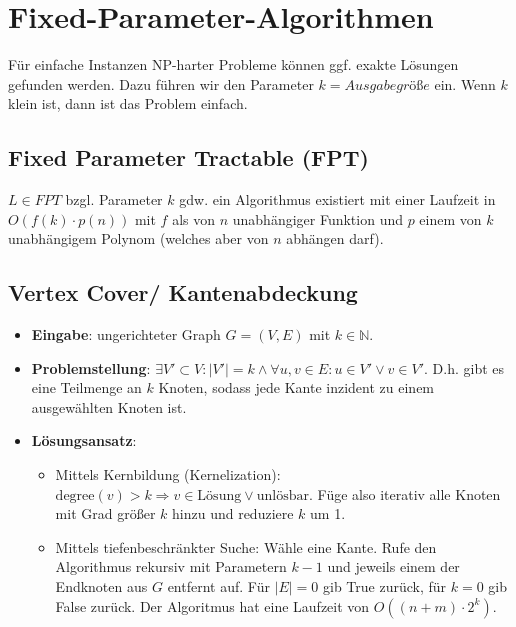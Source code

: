 \chapter{Fixed-Parameter-Algorithmen}

Für einfache Instanzen NP-harter Probleme können ggf. exakte Lösungen gefunden werden. 
Dazu führen wir den Parameter $k = Ausgabegröße$ ein. Wenn $k$ klein ist, dann ist das Problem einfach.


\section{Fixed Parameter Tractable (FPT)}
$L\in FPT$ bzgl. Parameter $k$ gdw. ein Algorithmus existiert mit einer Laufzeit in $O(f(k)\cdot p(n))$ mit $f$ als von $n$ unabhängiger Funktion und $p$ einem von $k$ unabhängigem Polynom (welches aber von $n$ abhängen darf).

\section{Vertex Cover/ Kantenabdeckung}

\begin{itemize}
  \item \textbf{Eingabe}: ungerichteter Graph $G=(V,E)$ mit $k\in \mathbb{N}$.
  \item \textbf{Problemstellung}: $\exists V' \subset V: |V'| = k \land \forall {u,v} \in E: u\in V' \lor v \in V'$. D.h. gibt es eine Teilmenge an $k$ Knoten, sodass jede Kante inzident zu einem ausgewählten Knoten ist.
  \item \textbf{Lösungsansatz}: 
  \begin{itemize}
  	\item Mittels Kernbildung (Kernelization): $\text{degree}(v)>k \Rightarrow v \in \text{Lösung} \lor \text{unlösbar}$. Füge also iterativ alle Knoten mit Grad größer $k$ hinzu und reduziere $k$ um 1.
  	\item Mittels tiefenbeschränkter Suche: Wähle eine Kante. Rufe den Algorithmus rekursiv mit Parametern $k-1$ und jeweils einem der Endknoten aus $G$ entfernt auf. Für $|E|=0$ gib True zurück, für $k=0$ gib False zurück. Der Algoritmus hat eine Laufzeit von $O((n+m)\cdot 2^k)$.
  \end{itemize}
\end{itemize}
